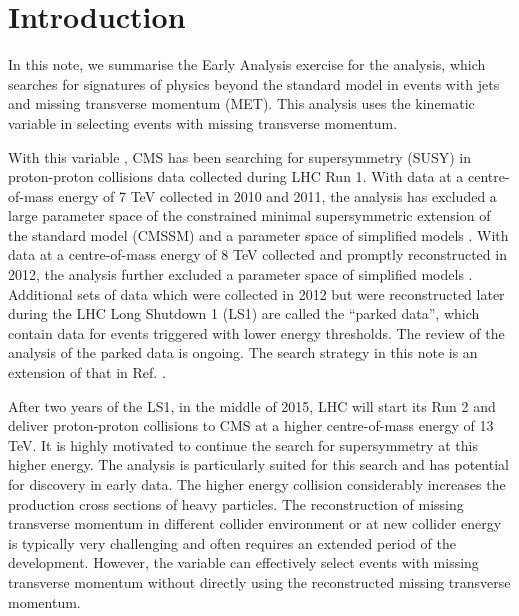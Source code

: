 \section{Introduction}
\label{sec:intro}

In this note, we summarise the Early Analysis exercise for the \alphat
analysis, which searches for signatures of physics beyond the standard
model in events with jets and missing transverse momentum (MET). This
analysis uses the kinematic variable \alphat in selecting events with
missing transverse momentum.

With this variable \alphat, CMS has been searching for supersymmetry
(SUSY) in proton-proton collisions data collected during LHC Run 1. With
data at a centre-of-mass energy of 7 TeV collected in 2010 and 2011, the
\alphat analysis has excluded a large parameter space of the constrained
minimal supersymmetric extension of the standard model (CMSSM)
\cite{Khachatryan:2011tk, Chatrchyan:2011zy, Chatrchyan:2012wa} and a
parameter space of simplified models \cite{Chatrchyan:2012wa}. With data
at a centre-of-mass energy of 8 TeV collected and promptly reconstructed
in 2012, the \alphat analysis further excluded a parameter space of
simplified models \cite{Chatrchyan:2013lya}. Additional sets of data
which were collected in 2012 but were reconstructed later during the LHC
Long Shutdown 1 (LS1) are called the ``parked data'', which contain data
for events triggered with lower energy thresholds. The review of the
\alphat analysis of the parked data \cite{CMS_AN_2013-366} is ongoing.
The search strategy in this note is an extension of that in Ref.
\cite{CMS_AN_2013-366}.

After two years of the LS1, in the middle of 2015, LHC will start its
Run 2 and deliver proton-proton collisions to CMS at a higher
centre-of-mass energy of 13 TeV. It is highly motivated to continue the
search for supersymmetry at this higher energy. The \alphat analysis is
particularly suited for this search and has potential for discovery in
early data. The higher energy collision considerably increases the
production cross sections of heavy particles. The reconstruction of
missing transverse momentum in different collider environment or at new
collider energy is typically very challenging and often requires an
extended period of the development. However, the variable \alphat can
effectively select events with missing transverse momentum without
directly using the reconstructed missing transverse momentum.

